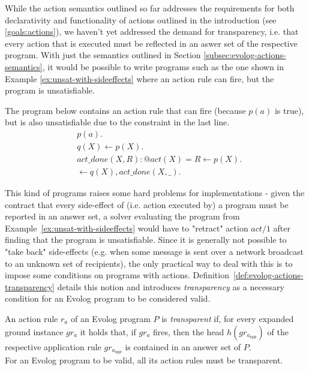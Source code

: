 While the action semantics outlined so far addresses the requirements for both declarativity and functionality of actions outlined in the introduction (see \ref{goals:actions}), we haven't yet addressed the demand for transparency, i.e. that every action that is executed must be reflected in an aswer set of the respective program. With just the semantics outlined in Section \ref{subsec:evolog-actions-semantics}, it would be possible to write programs such as the one shown in Example \ref{ex:unsat-with-sideeffects} where an action rule can fire, but the program is unsatisfiable.

\begin{example}
\label{ex:unsat-with-sideeffects}
The program below contains an action rule that can fire (because $p(a)$ is true), but is also unsatisfiable due to the constraint in the last line.
\begin{align*}
	&p(a). \\
	&q(X) \leftarrow p(X). \\
	&act\_done(X, R) : @act(X) = R \leftarrow p(X). \\
	&\leftarrow q(X), act\_done(X, \_).
\end{align*}
\end{example}

This kind of programs raises some hard problems for implementations - given the contract that every side-effect of (i.e. action executed by) a program must be reported in an answer set, a solver evaluating the program from Example~\ref{ex:unsat-with-sideeffects} would have to "retract" action $act/1$ after finding that the program is unsatisfiable. Since it is generally not possible to "take back" side-effects (e.g. when some message is sent over a network broadcast to an unknown set of recipients), the only practical way to deal with this is to impose some conditions on programs with actions. Definition~\ref{def:evolog-actions-transparency} details this notion and introduces \emph{transparency} as a necessary condition for an Evolog program to be considered valid.

\begin{definition}
\label{def:evolog-actions-transparency}
An action rule $r_a$ of an Evolog program $P$ is \emph{transparent} if, for every expanded ground instance $gr_a$ it holds that, if $gr_a$ fires, then the head $h(gr_{a_{app}})$ of the respective application rule $gr_{a_{app}}$ is contained in an answer set of $P$. \\

For an Evolog program to be valid, all its action rules must be transparent.
\end{definition}

